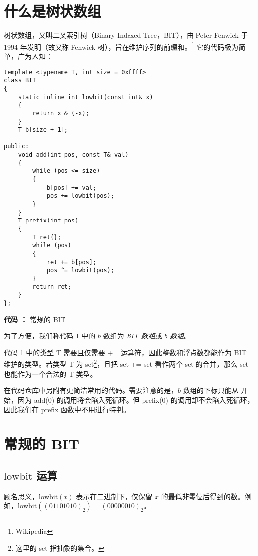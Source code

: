 \documentclass[UTF8]{article}
\title{\insertsubject}
\author{}
\date{}
\newcounter {icode}
\newcommand \inserticode {\arabic{icode}}
\newcommand \illuscode[1]
{
	\stepcounter{icode}
	\begin{center}
		\textbf{代码 \inserticode：} #1
	\end{center}
}
\newcommand \code[1] {\colorbox[RGB]{245,245,245}{\Consolas #1}}
\begin{document}
	\maketitle
	\tableofcontents
	\thispagestyle{empty}

	\clearpage
	\setcounter{page}{1}

	\section{什么是树状数组}

	树状数组，又叫二叉索引树（Binary Indexed Tree，BIT），由 Peter Fenwick 于 1994 年发明（故又称 Fenwick 树），旨在维护序列的前缀和。\footnote{Wikipedia}
	它的代码极为简单，广为人知：
	\begin{lstlisting}
template <typename T, int size = 0xffff>
class BIT
{
	static inline int lowbit(const int& x)
	{
		return x & (-x);
	}
	T b[size + 1];

public:
	void add(int pos, const T& val)
	{
		while (pos <= size)
		{
			b[pos] += val;
			pos += lowbit(pos);
		}
	}
	T prefix(int pos)
	{
		T ret{};
		while (pos)
		{
			ret += b[pos];
			pos ^= lowbit(pos);
		}
		return ret;
	}
};
	\end{lstlisting}
	\illuscode{常规的 BIT}

	为了方便，我们称代码 1 中的 $b$ 数组为 \textit{BIT 数组}或 \textit{$b$ 数组}。

	代码 1 中的类型 \code{T} 需要且仅需要 \code{+=} 运算符，因此整数和浮点数都能作为 BIT 维护的类型。若类型 \code{T} 为 \code{set}\footnote{这里的 \code{set} 指抽象的集合。}，且把 \code{set += set} 看作两个 \code{set} 的合并，那么 \code{set} 也能作为一个合法的 \code{T} 类型。

	在代码仓库中另附有更简洁常用的代码。需要注意的是，$b$ 数组的下标只能从 \code{1} 开始，因为 \code{add(0)} 的调用将会陷入死循环。但 \code{prefix(0)} 的调用却不会陷入死循环，因此我们在 \code{prefix} 函数中不用进行特判。

	\section{常规的 BIT}

	\newcommand \lowbit {\mathrm{lowbit}}

	\subsection{$\lowbit$ 运算}

	顾名思义，$\lowbit(x)$ 表示在二进制下，仅保留 $x$ 的最低非零位后得到的数。例如，$\lowbit((01101010)_2) = (00000010)_2$。
\end{document}
